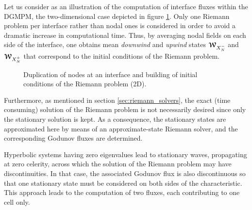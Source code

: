 Let us consider as an illustration of the computation of interface fluxes within the DGMPM, the two-dimensional case depicted in figure \ref{fig:2D_edge}.
Only one Riemann problem per interface rather than nodal ones is considered in order to avoid a dramatic increase in computational time.
Thus, by averaging nodal fields on each side of the interface, one obtains mean \textit{downwind} and \textit{upwind} states ${\boldsymbol{\mathcal{W}}}_{X_N^-}$ and ${\boldsymbol{\mathcal{W}}}_{X_N^+}$ that correspond to the initial conditions of the Riemann problem.
\begin{figure}[h!]
  \centering
  
  \caption{Duplication of nodes at an interface and building of initial conditions of the Riemann problem (2D).}
  \label{fig:2D_edge}
\end{figure}
Furthermore, as mentioned in section \ref{sec:riemann_solvers}, the exact (time consuming) solution of the Riemann problem is not necessarily desired since only the stationary solution is kept. As a consequence, the stationary states are approximated here by means of an approximate-state Riemann solver, and the corresponding Godunov fluxes are determined.
\begin{remark}
  Hyperbolic systems having zero eigenvalues lead to stationary waves, propagating at zero celerity, across which the solution of the Riemann problem may have discontinuities. In that case, the associated Godunov flux is also discontinuous so that one stationary state must be considered on both sides of the characteristic. This approach leads to the computation of two fluxes, each contributing to one cell only. 
\end{remark}

